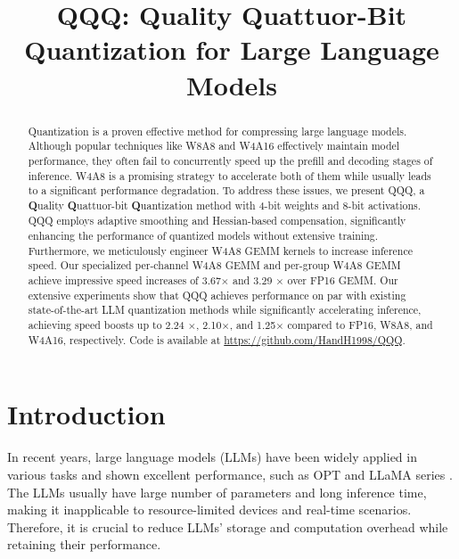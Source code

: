\title{QQQ: Quality Quattuor-Bit Quantization for Large Language Models}



\maketitle
\begin{abstract}
Quantization is a proven effective method for compressing large language models. Although popular techniques like W8A8 and W4A16 effectively maintain model performance, they often fail to concurrently speed up the prefill and decoding stages of inference. W4A8 is a promising strategy to accelerate both of them while usually leads to a significant performance degradation.
To address these issues, we present QQQ, a \textbf{Q}uality \textbf{Q}uattuor-bit \textbf{Q}uantization method with 4-bit weights and 8-bit activations. QQQ employs adaptive smoothing and Hessian-based compensation, significantly enhancing the performance of quantized models without extensive training.
Furthermore, we meticulously engineer W4A8 GEMM kernels to increase inference speed. 
Our specialized per-channel W4A8 GEMM and per-group W4A8 GEMM achieve impressive speed increases of 3.67$\times$ and 3.29 $\times$ over FP16 GEMM.
Our extensive experiments show that QQQ achieves performance on par with existing state-of-the-art LLM quantization methods while significantly accelerating inference, achieving speed boosts up to 2.24 $\times$, 2.10$\times$, and 1.25$\times$ compared to FP16, W8A8, and W4A16, respectively. Code is available at \url{https://github.com/HandH1998/QQQ}.
\end{abstract}

\section{Introduction}
In recent years, large language models (LLMs) have been widely applied in various tasks and shown excellent performance, such as OPT \citep{zhang2022opt} and LLaMA series \cite{touvron2023llama, touvron2023llama2}.
The LLMs usually have large number of parameters and long inference time, making it inapplicable to resource-limited devices and real-time scenarios.
Therefore, it is crucial to reduce LLMs' storage and computation overhead while retaining their performance. 

